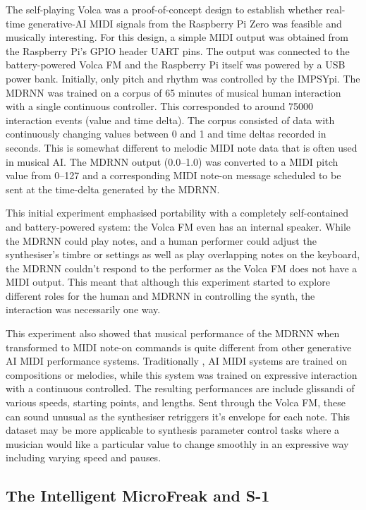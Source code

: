 \documentclass[manuscript,review,anonymous]{acmart}
\begin{document}
The self-playing Volca was a proof-of-concept design to establish whether real-time generative-AI MIDI signals from the Raspberry Pi Zero was feasible and musically interesting.
For this design, a simple MIDI output was obtained from the Raspberry Pi's GPIO header UART pins.
The output was connected to the battery-powered Volca FM and the Raspberry Pi itself was powered by a USB power bank.
Initially, only pitch and rhythm was controlled by the IMPSYpi.
The MDRNN was trained on a corpus of 65 minutes of musical human interaction with a single continuous controller. This corresponded to around 75000 interaction events (value and time delta).
The corpus consisted of data with continuously changing values between 0 and 1 and time deltas recorded in seconds. This is somewhat different to melodic MIDI note data that is often used in musical AI. 
The MDRNN output (0.0--1.0) was converted to a MIDI pitch value from 0--127 and a corresponding MIDI note-on message scheduled to be sent at the time-delta generated by the MDRNN.

This initial experiment emphasised portability with a completely self-contained and battery-powered system: the Volca FM even has an internal speaker.
While the MDRNN could play notes, and a human performer could adjust the synthesiser's timbre or settings as well as play overlapping notes on the keyboard, the MDRNN couldn't respond to the performer as the Volca FM does not have a MIDI output.
This meant that although this experiment started to explore different roles for the human and MDRNN in controlling the synth, the interaction was necessarily one way.

This experiment also showed that musical performance of the MDRNN when transformed to MIDI note-on commands is quite different from other generative AI MIDI performance systems. Traditionally , AI MIDI systems are trained on compositions or melodies, while this system was trained on expressive interaction with a continuous controlled. 
The resulting performances are include glissandi of various speeds, starting points, and lengths.
Sent through the Volca FM, these can sound unusual as the synthesiser retriggers it's envelope for each note.
This dataset may be more applicable to synthesis parameter control tasks where a musician would like a particular value to change smoothly in an expressive way including varying speed and pauses.


\subsection{The Intelligent MicroFreak and S-1}
\end{document}
